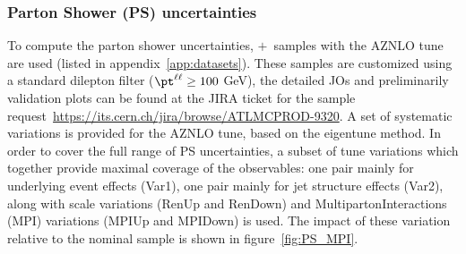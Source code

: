 {\subsubsection{Parton Shower (PS) uncertainties}
To compute the parton shower uncertainties, \powheg$+$\pythia~samples with the AZNLO tune are used (listed in appendix~\ref{app:datasets}). These samples are customized using a standard dilepton \pt filter ($\pt^{\ell\ell}\geq100$ GeV), the detailed JOs and preliminarily validation plots can be found at the JIRA ticket for the sample request~\url{https://its.cern.ch/jira/browse/ATLMCPROD-9320}. A set of systematic variations is provided for the AZNLO tune, based on the eigentune method. In order to cover the full range of PS uncertainties, a subset of tune variations which together provide maximal coverage of the observables: one pair mainly for underlying event effects (Var1), one pair mainly for jet structure effects (Var2), along with scale variations (RenUp and RenDown) and MultipartonInteractions (MPI) variations (MPIUp and MPIDown) is used. The impact of these variation relative to the nominal sample is shown in figure~\ref{fig:PS_MPI}.

}
